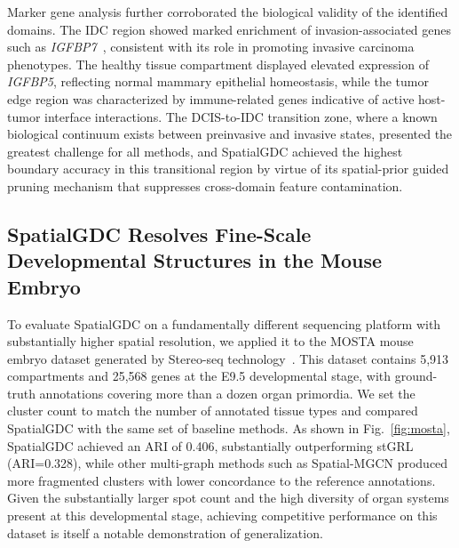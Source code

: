 \documentclass[lettersize,journal]{IEEEtran}
\begin{document}
Marker gene analysis further corroborated the biological validity of the identified domains. The IDC region showed marked enrichment of invasion-associated genes such as \textit{IGFBP7}~\cite{benatar2012igfbp7}, consistent with its role in promoting invasive carcinoma phenotypes. The healthy tissue compartment displayed elevated expression of \textit{IGFBP5}, reflecting normal mammary epithelial homeostasis, while the tumor edge region was characterized by immune-related genes indicative of active host-tumor interface interactions. The DCIS-to-IDC transition zone, where a known biological continuum exists between preinvasive and invasive states, presented the greatest challenge for all methods, and SpatialGDC achieved the highest boundary accuracy in this transitional region by virtue of its spatial-prior guided pruning mechanism that suppresses cross-domain feature contamination.

\subsection{SpatialGDC Resolves Fine-Scale Developmental Structures in the Mouse Embryo}

To evaluate SpatialGDC on a fundamentally different sequencing platform with substantially higher spatial resolution, we applied it to the MOSTA mouse embryo dataset generated by Stereo-seq technology~\cite{chen2022stereoseq}. This dataset contains 5,913 compartments and 25,568 genes at the E9.5 developmental stage, with ground-truth annotations covering more than a dozen organ primordia. We set the cluster count to match the number of annotated tissue types and compared SpatialGDC with the same set of baseline methods. As shown in Fig.~\ref{fig:mosta}, SpatialGDC achieved an ARI of 0.406, substantially outperforming stGRL (ARI=0.328), while other multi-graph methods such as Spatial-MGCN produced more fragmented clusters with lower concordance to the reference annotations. Given the substantially larger spot count and the high diversity of organ systems present at this developmental stage, achieving competitive performance on this dataset is itself a notable demonstration of generalization.
\end{document}
